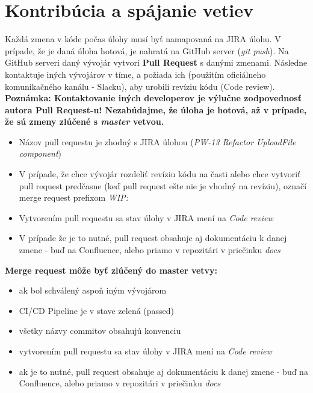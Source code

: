 \documentclass{article}
\begin{document}
    \pagebreak
    \section*{Kontribúcia a spájanie vetiev}

        Každá zmena v kóde počas úlohy musí byť namapovaná na JIRA úlohu.
        V prípade, že je daná úloha hotová, je nahratá na GitHub server (\emph{git push}).
        Na GitHub serveri daný vývojár vytvorí \textbf{Pull Request} s danými zmenami.
        Následne kontaktuje iných vývojárov v tíme, a požiada ich (použitím oficiálneho komunikačného kanálu - Slacku),
        aby urobili revíziu kódu (Code review). \\

        \noindent \textbf{Poznámka: Kontaktovanie iných developerov je výlučne zodpovednosť autora Pull Request-u! Nezabúdajme, že úloha je hotová, až v prípade, že sú zmeny zlúčené s \emph{master} vetvou.} \\

    \begin{itemize}
        \item Názov pull requestu je zhodný s JIRA úlohou (\emph{PW-13 Refactor UploadFile component})
        \item V prípade, že chce vývojár rozdeliť revíziu kódu na časti alebo chce vytvoriť pull request predčasne (keď pull request ešte nie je vhodný na revíziu), označí merge request prefixom \emph{WIP:}
        \item Vytvorením pull requestu sa stav úlohy v JIRA mení na \emph{Code review}
        \item V prípade že je to nutné, pull request obsahuje aj dokumentáciu k danej zmene - buď na Confluence, alebo priamo v repozitári v priečinku \emph{docs}
    \end{itemize}

    \bigskip

    \textbf{Merge request môže byť zlúčený do master vetvy:}
    \begin{itemize}
        \item ak bol schválený aspoň iným vývojárom
        \item CI/CD Pipeline je v stave zelená (passed)
        \item všetky názvy commitov obsahujú konvenciu
        \item vytvorením pull requestu sa stav úlohy v JIRA mení na \emph{Code review}
        \item ak je to nutné, pull request obsahuje aj dokumentáciu k danej zmene - buď na Confluence, alebo priamo v repozitári v priečinku \emph{docs}
    \end{itemize}
\end{document}

